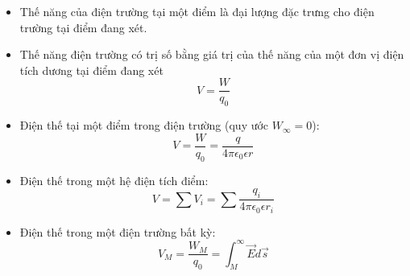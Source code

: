 \begin{itemize}
  \item Thế năng của điện trường tại một điểm là đại lượng đặc trưng cho điện trường tại điểm đang xét.
  \item Thế năng điện trường có trị số bằng giá trị của thế năng của một đơn vị điện tích dương tại điểm đang xét 
  \begin{equation*}
    V = \frac{W}{q_0}
  \end{equation*}
  \item Điện thế tại một điểm trong điện trường (quy ước $W_\infty = 0$): 
  \begin{equation*}
    V = \frac{W}{q_0} = \frac{q}{4\pi\epsilon_0\epsilon r}
  \end{equation*}
  \item Điện thế trong một hệ điện tích điểm:
  \begin{equation*}
    V = \sum V_i = \sum \frac{q_i}{4\pi\epsilon_0\epsilon r_i}
  \end{equation*}
  \item Điện thế trong một điện trường bất kỳ:
  \begin{equation*}
    V_M = \frac{W_M}{q_0} = \int_{M}^{\infty} \vec{E}d\vec{s}
  \end{equation*}
\end{itemize}
